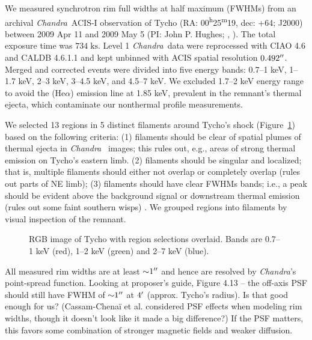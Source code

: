 \documentclass[iop, apj, numberedappendix, twocolappendix]{emulateapj}
\newcommand*{\mt}{\mathrm}
\newcommand*{\unit}[1]{\;\mt{#1}}  %
\newcommand*{\abt}{\mathord{\sim}} %
\newcommand*{\tsup}{\textsuperscript}
\newcommand*{\Chandra}{\textit{Chandra}\ }
\begin{document}
We measured synchrotron rim full widths at half maximum (FWHMs) from an
archival \Chandra ACIS-I observation of Tycho
(RA: 00\tsup{h}25\tsup{m}19, dec: +64; J2000)
between 2009 Apr 11 and 2009 May 5 (PI: John P. Hughes;
,
).
The total exposure time was $734 \unit{ks}$.
Level 1 \Chandra data were reprocessed with CIAO 4.6 and CALDB 4.6.1.1 and kept
unbinned with ACIS spatial resolution $0.492\mbox{$^{\prime\prime}$}$.
Merged and corrected events were divided into five energy bands:
0.7--1 keV, 1--1.7 keV, 2--3 keV, 3--4.5 keV, and 4.5--7 keV.
We excluded 1.7--2 keV energy range to avoid the  (He$\alpha$)
emission line at 1.85 keV, prevalent in the remnant's thermal ejecta, which
  
contaminate our nonthermal profile measurements.

We selected 13 regions in 5 distinct filaments around Tycho's shock
(Figure~\ref{fig:snr}) based on the following criteria:
(1) filaments should be clear of spatial plumes of thermal ejecta in \Chandra
images; this rules out, e.g., areas of strong thermal emission on Tycho's eastern limb.
(2) filaments should be singular and localized; that is, multiple filaments
should either not overlap or completely overlap (rules out parts of NE limb);
(3) filaments should have clear FWHMs bands; i.e., a peak should be evident
above the background signal or downstream thermal emission (rules out some
faint southern wisps) .
We grouped regions into filaments by visual inspection of the remnant.

\begin{figure}
    \centering
    \caption{RGB image of Tycho with region selections overlaid.  Bands are
    0.7--1 keV (red), 1--2 keV (green) and 2--7 keV (blue).
    }
    \label{fig:snr}
\end{figure}

All measured rim widths are at least $\abt 1\arcsec$ and hence are resolved by
\textit{Chandra}'s point-spread function.
Looking at proposer's guide, Figure 4.13 -- the off-axis PSF should
still have FWHM of $\abt 1\arcsec$ at $4\mbox{$^\prime$}$ (approx. Tycho's radius).
Is that good enough for us?
(Cassam-Chena\"i et al. considered PSF effects when modeling rim widths, though
it doesn't look like it made a big difference?)
If the PSF matters, this favors some combination of stronger
magnetic fields and weaker diffusion.
\end{document}
